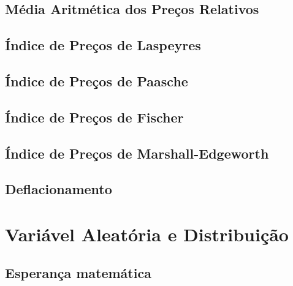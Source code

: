\documentclass[
]{book}
\begin{document}
\hypertarget{muxe9dia-aritmuxe9tica-dos-preuxe7os-relativos}{%
\section{Média Aritmética dos Preços Relativos}\label{muxe9dia-aritmuxe9tica-dos-preuxe7os-relativos}}

\hypertarget{uxedndice-de-preuxe7os-de-laspeyres}{%
\section{Índice de Preços de Laspeyres}\label{uxedndice-de-preuxe7os-de-laspeyres}}

\hypertarget{uxedndice-de-preuxe7os-de-paasche}{%
\section{Índice de Preços de Paasche}\label{uxedndice-de-preuxe7os-de-paasche}}

\hypertarget{uxedndice-de-preuxe7os-de-fischer}{%
\section{Índice de Preços de Fischer}\label{uxedndice-de-preuxe7os-de-fischer}}

\hypertarget{uxedndice-de-preuxe7os-de-marshall-edgeworth}{%
\section{Índice de Preços de Marshall-Edgeworth}\label{uxedndice-de-preuxe7os-de-marshall-edgeworth}}

\hypertarget{deflacionamento}{%
\section{Deflacionamento}\label{deflacionamento}}

\hypertarget{variuxe1vel-aleatuxf3ria-e-distribuiuxe7uxe3o}{%
\chapter{Variável Aleatória e Distribuição}\label{variuxe1vel-aleatuxf3ria-e-distribuiuxe7uxe3o}}

\hypertarget{esperanuxe7a-matemuxe1tica}{%
\section{Esperança matemática}\label{esperanuxe7a-matemuxe1tica}}
\end{document}
